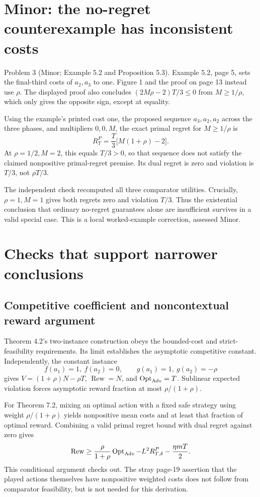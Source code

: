 \documentclass[10pt]{article}
\begin{document}
\section*{Minor: the no-regret counterexample has inconsistent costs}
Problem 3 (Minor; Example 5.2 and Proposition 5.3).  Example 5.2, page 5, sets the final-third costs of \(a_2,a_3\) to one. Figure 1 and the proof on page 13 instead use \(\rho\). The displayed proof also concludes \((2M\rho-2)T/3\le0\) from \(M\ge1/\rho\), which only gives the opposite sign, except at equality.\par
Using the example’s printed cost one, the proposed sequence \(a_3,a_2,a_2\) across the three phases, and multipliers \(0,0,M\), the exact primal regret for \(M\ge1/\rho\) is \[R_T^P=\frac T3\bigl[M(1+\rho)-2\bigr].\] At \(\rho=1/2,M=2\), this equals \(T/3>0\), so that sequence does not satisfy the claimed nonpositive primal-regret premise. Its dual regret is zero and violation is \(T/3\), not \(\rho T/3\).\par
The independent check recomputed all three comparator utilities. Crucially, \(\rho=1,M=1\) gives both regrets zero and violation \(T/3\). Thus the existential conclusion that ordinary no-regret guarantees alone are insufficient survives in a valid special case. This is a local worked-example correction, assessed Minor.\par
\section*{Checks that support narrower conclusions}
\subsection*{Competitive coefficient and noncontextual reward argument}
Theorem 4.2’s two-instance construction obeys the bounded-cost and strict-feasibility requirements. Its limit establishes the asymptotic competitive constant. Independently, the constant instance \[f(a_1)=1,\ f(a_2)=0,\qquad
 g(a_1)=1,\ g(a_2)=-\rho\] gives \(V=(1+\rho)N-\rho T\), \(\operatorname{Rew}=N\), and \(\operatorname{Opt}_{\rm Adv}=T\). Sublinear expected violation forces asymptotic reward fraction at most \(\rho/(1+\rho)\).\par
For Theorem 7.2, mixing an optimal action with a fixed safe strategy using weight \(\rho/(1+\rho)\) yields nonpositive mean costs and at least that fraction of optimal reward. Combining a valid primal regret bound with dual regret against zero gives \[\operatorname{Rew}\ge
 \frac{\rho}{1+\rho}\operatorname{Opt}_{\rm Adv}
 -L^2R^P_{T,\delta}-\frac{\eta mT}{2}.\] This conditional argument checks out. The stray page-19 assertion that the played actions themselves have nonpositive weighted costs does not follow from comparator feasibility, but is not needed for this derivation.\par
\end{document}
